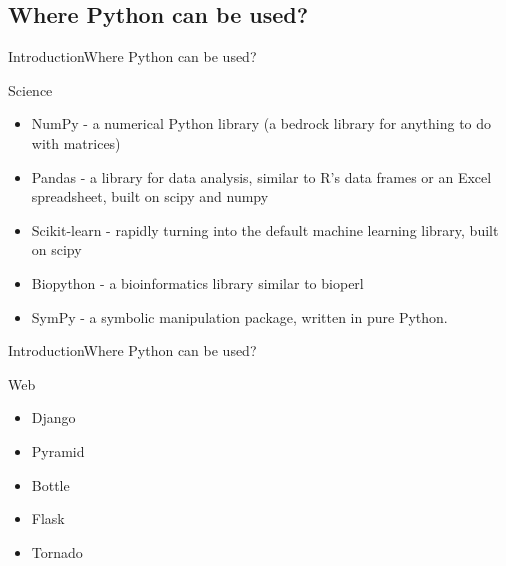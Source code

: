 \documentclass[10pt]{beamer}
\begin{document}
\subsection{Where Python can be used?}

\begin{frame}{Introduction}{Where Python can be used?}

\begin{block}{Science}
	\begin{itemize}	
		\item NumPy - a numerical Python library (a bedrock library for anything to do with matrices)
		
		\item Pandas - a library for data analysis, similar to R’s data frames or an Excel spreadsheet, built on scipy and numpy
		
		\item Scikit-learn - rapidly turning into the default machine learning library, built on scipy
		
		\item Biopython - a bioinformatics library similar to bioperl
		
		\item SymPy - a symbolic manipulation package, written in pure Python.
	\end{itemize}
	
\end{block}
\end{frame}

\begin{frame}{Introduction}{Where Python can be used?}
	
	\begin{block}{Web}
		\begin{itemize}
			\item Django
			
			\item Pyramid
			
			\item Bottle
			
			\item Flask
			
			\item Tornado
		\end{itemize}
		
	\end{block}
\end{frame}
\end{document}
